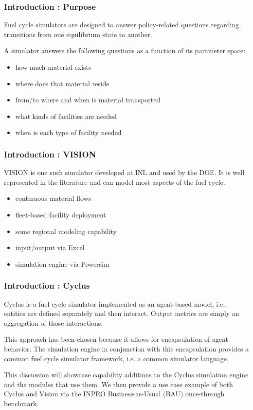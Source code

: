 
\begin{frame}[ctb!]
  \frametitle{Introduction : Purpose}
  Fuel cycle simulators are designed to answer policy-related questions
  regarding transitions from one equilibrium state to another.

  \vspace{0.2cm}

  \pause
  A simulator answers the following questions as a function of its 
  parameter space:
  \begin{itemize}
    \item how much material exists
    \item where does that material reside
    \item from/to where and when is material transported
    \item what kinds of facilities are needed
    \item when is each type of facility needed
  \end{itemize}
\end{frame}

\begin{frame}[ctb!]
  \frametitle{Introduction : VISION}
  VISION is one such simulator developed at INL and used by the DOE. 
  It is well represented in the literature and can model most aspects 
  of the fuel cycle. \cite{yacout_vision_2006}
  \begin{itemize}
    \item continuous material flows
    \item fleet-based facility deployment
    \item some regional modeling capability
    \item input/output via Excel
    \item simulation engine via Powersim
  \end{itemize}
\end{frame}

\begin{frame}[ctb!]
  \frametitle{Introduction : Cyclus}
  Cyclus is a fuel cycle simulator implemented as an agent-based model,
  i.e., entities are defined separately and then interact. Output 
  metrics are simply an aggregation of those interactions.

  \vspace{0.4cm}

  This approach has been chosen because it allows for encapsulation of
  agent behavior. The simulation engine in conjunction with this 
  encapsulation provides a common fuel cycle simulator framework, i.e.
  a common simulator language.

  \vspace{0.4cm}

  \pause
  This discussion will showcase capability additions to the Cyclus
  simulation engine and the modules that use them. We then provide a
  use case example of both Cyclus and Vision via the INPRO 
  Business-as-Usual (BAU) once-through benchmark.
\end{frame}


